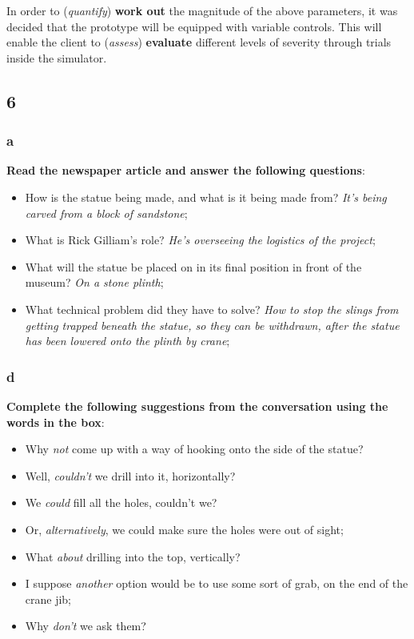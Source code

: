 In order to (\textit{quantify}) \textbf{work out} the magnitude of the above parameters, it was decided that the prototype will be equipped with variable controls. This will enable the client to (\textit{assess}) \textbf{evaluate} different levels of severity through trials inside the simulator.

\subsection{6}

\subsubsection{a}

\textbf{Read the newspaper article and answer the following questions}:

\begin{itemize}

\item How is the statue being made, and what is it being made from? \textit{It's being carved from a block of sandstone};
\item What is Rick Gilliam's role? \textit{He's overseeing the logistics of the project};
\item What will the statue be placed on in its final position in front of the museum? \textit{On a stone plinth};
\item What technical problem did they have to solve? \textit{How to stop the slings from getting trapped beneath the statue, so they can be withdrawn, after the statue has been lowered onto the plinth by crane};

\end{itemize}

\subsubsection{d}

\textbf{ Complete the following suggestions from the conversation using the words in the box}:

\begin{itemize}

\item Why \textit{not} come up with a way of hooking onto the side of the statue?
\item Well, \textit{couldn't} we drill into it, horizontally?
\item We \textit{could} fill all the holes, couldn't we?
\item Or, \textit{alternatively}, we could make sure the holes were out of sight;
\item What \textit{about} drilling into the top, vertically?
\item I suppose \textit{another} option would be to use some sort of grab, on the end of the crane jib;
\item Why \textit{don't} we ask them?

\end{itemize}

